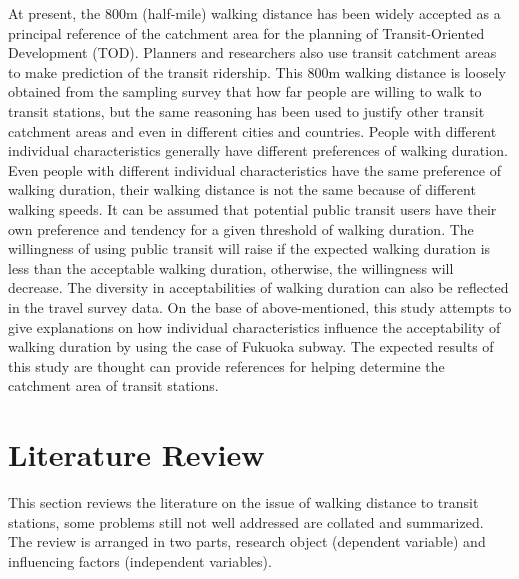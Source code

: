 \documentclass[Journal,letterpaper]{ascelike-new}
\begin{document}
%
At present, the 800m (half-mile) walking distance has been widely accepted as a principal reference of the catchment area for the planning of Transit-Oriented Development (TOD). Planners and researchers also use transit catchment areas to make prediction of the transit ridership. This 800m walking distance is loosely obtained from the sampling survey that how far people are willing to walk to transit stations, but the same reasoning has been used to justify other transit catchment areas and even in different cities and countries. People with different individual characteristics generally have different preferences of walking duration. Even people with different individual characteristics have the same preference of walking duration, their walking distance is not the same because of different walking speeds. It can be assumed that potential public transit users have their own preference and tendency for a given threshold of walking duration. The willingness of using public transit will raise if the expected walking duration is less than the acceptable walking duration, otherwise, the willingness will decrease. The diversity in acceptabilities of walking duration can also be reflected in the travel survey data. On the base of above-mentioned, this study attempts to give explanations on how individual characteristics influence the acceptability of walking duration by using the case of Fukuoka subway. The expected results of this study are thought can provide references for helping determine the catchment area of transit stations.

%
\section{Literature Review}
This section reviews the literature on the issue of walking distance to transit stations, some problems still not well addressed are collated and summarized. The review is arranged in two parts, research object (dependent variable) and influencing factors (independent variables).
\end{document}
